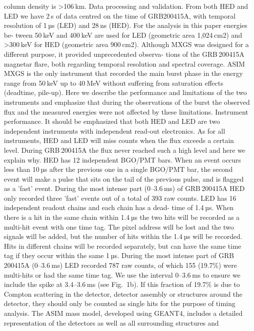column density is >106 km.
Data processing and validation. From both HED and LED we have 2 s
of data centred on the time of GRB200415A, with temporal resolution
of 1 µs (LED) and 28 ns (HED). For the analysis in this paper energies be-
tween 50 keV and 400 keV are used for LED (geometric area 1,024 cm2)
and >300 keV for HED (geometric area 900 cm2). Although MXGS was
designed for a different purpose, it provided unprecedented observa-
tions of the GRB 200415A magnetar flare, both regarding temporal
resolution and spectral coverage. ASIM MXGS is the only instrument
that recorded the main burst phase in the energy range from 50 keV
up to 40 MeV without suffering from saturation effects (deadtime,
pile-up). Here we describe the performance and limitations of the two
instruments and emphasize that during the observations of the burst
the observed flux and the measured energies were not affected by
these limitations.
Instrument performance. It should be emphasized that both HED
and LED are two independent instruments with independent read-out
electronics. As for all instruments, HED and LED will miss counts when
the flux exceeds a certain level. During GRB 200415A the flux never
reached such a high level and here we explain why.
HED has 12 independent BGO/PMT bars. When an event occurs less
than 10 µs after the previous one in a single BGO/PMT bar, the second
event will make a pulse that sits on the tail of the previous pulse, and
is flagged as a 'fast' event. During the most intense part (0–3.6 ms) of
GRB 200415A HED only recorded three 'fast' events out of a total of
393 raw counts.
LED has 16 independent readout chains and each chain has a dead-
time of 1.4 µs. When there is a hit in the same chain within 1.4 µs the two
hits will be recorded as a multi-hit event with one time tag. The pixel
address will be lost and the two signals will be added, but the number
of hits within the 1.4 µs will be recorded. Hits in different chains will be
recorded separately, but can have the same time tag if they occur within
the same 1 µs. During the most intense part of GRB 200415A (0–3.6 ms)
LED recorded 787 raw counts, of which 155 (19.7\%) were multi-hits or had
the same time tag. We use the interval 0–3.6 ms to ensure we include
the spike at 3.4–3.6 ms (see Fig. 1b). If this fraction of 19.7\% is due to
Compton scattering in the detector, detector assembly or structures
around the detector, they should only be counted as single hits for the
purpose of timing analysis.
The ASIM mass model, developed using GEANT4, includes a detailed
representation of the detectors as well as all surrounding structures and
